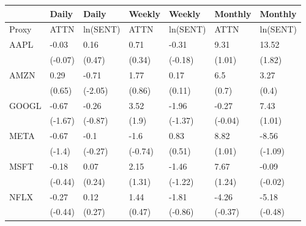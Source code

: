 \begin{tabular}{lllllll}
\toprule
{} &    Daily &     Daily &   Weekly &    Weekly &  Monthly &   Monthly \\
\midrule
Proxy &     ATTN &  ln(SENT) &     ATTN &  ln(SENT) &     ATTN &  ln(SENT) \\
AAPL  &    -0.03 &      0.16 &     0.71 &     -0.31 &     9.31 &     13.52 \\
      &  (-0.07) &    (0.47) &   (0.34) &   (-0.18) &   (1.01) &    (1.82) \\
AMZN  &     0.29 &     -0.71 &     1.77 &      0.17 &      6.5 &      3.27 \\
      &   (0.65) &   (-2.05) &   (0.86) &    (0.11) &    (0.7) &     (0.4) \\
GOOGL &    -0.67 &     -0.26 &     3.52 &     -1.96 &    -0.27 &      7.43 \\
      &  (-1.67) &   (-0.87) &    (1.9) &   (-1.37) &  (-0.04) &    (1.01) \\
META  &    -0.67 &      -0.1 &     -1.6 &      0.83 &     8.82 &     -8.56 \\
      &   (-1.4) &   (-0.27) &  (-0.74) &    (0.51) &   (1.01) &   (-1.09) \\
MSFT  &    -0.18 &      0.07 &     2.15 &     -1.46 &     7.67 &     -0.09 \\
      &  (-0.44) &    (0.24) &   (1.31) &   (-1.22) &   (1.24) &   (-0.02) \\
NFLX  &    -0.27 &      0.12 &     1.44 &     -1.81 &    -4.26 &     -5.18 \\
      &  (-0.44) &    (0.27) &   (0.47) &   (-0.86) &  (-0.37) &   (-0.48) \\
\bottomrule
\end{tabular}
